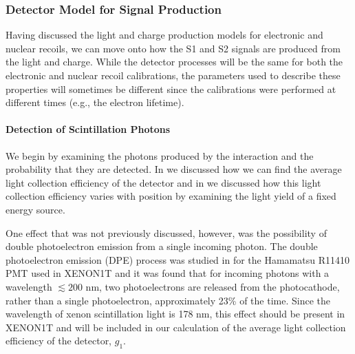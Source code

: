 \subsubsection{Detector Model for Signal Production}
\label{sec:xe1t_mc_detector}

Having discussed the light and charge production models for electronic and nuclear recoils, we can move onto how the S1 and S2 signals are produced from the light and charge.  While the detector processes will be the same for both the electronic and nuclear recoil calibrations, the parameters used to describe these properties will sometimes be different since the calibrations were performed at different times (e.g., the electron lifetime).




\paragraph{Detection of Scintillation Photons}

We begin by examining the photons produced by the interaction and the probability that they are detected.  In  we discussed how we can find the average light collection efficiency of the detector and in  we discussed how this light collection efficiency varies with position by examining the light yield of a fixed energy source.  

One effect that was not previously discussed, however, was the possibility of double photoelectron emission from a single incoming photon.  The double photoelectron emission (DPE) process was studied in  for the Hamamatsu R11410 PMT used in XENON1T and it was found that for incoming photons with a wavelength $\lesssim 200$ nm, two photoelectrons are released from the photocathode, rather than a single photoelectron, approximately 23\% of the time.  Since the wavelength of xenon scintillation light is 178 nm, this effect should be present in XENON1T and will be included in our calculation of the average light collection efficiency of the detector, $g_1$.


